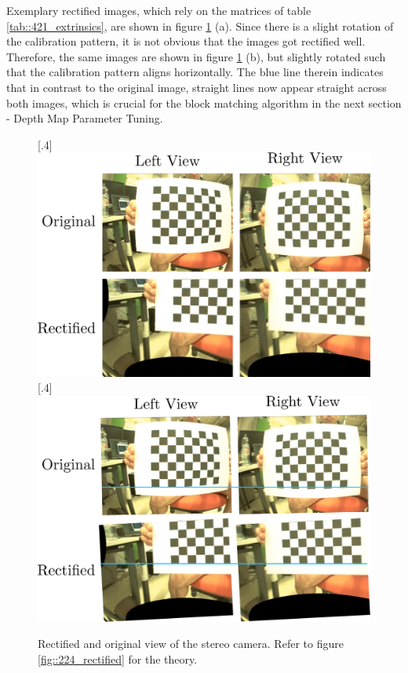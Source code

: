 Exemplary rectified images, which rely on the matrices of table \ref{tab::421_extrinsics}, are shown in figure \ref{fig::421_rect} (a). Since there is a slight rotation of the calibration pattern, it is not obvious that the images got rectified well. Therefore, the same images are shown in figure \ref{fig::421_rect} (b), but slightly rotated such that the calibration pattern aligns horizontally. The blue line therein indicates that in contrast to the original image, straight lines now appear straight across both images, which is crucial for the block matching algorithm in the next section - Depth Map Parameter Tuning.
\begin{figure}[h!]
	\centering
	[.4\linewidth]{\includegraphics[scale=.25]{chapters/04_experiments/02_autonomous_walking/01_camera_calibration/rect.png}}
	[.4\linewidth]{\includegraphics[scale=.25]{chapters/04_experiments/02_autonomous_walking/01_camera_calibration/rect_line.png}}
	\caption{Rectified and original view of the stereo camera. Refer to figure \ref{fig::224_rectified} for the theory.}
	\label{fig::421_rect}
\end{figure}
\FloatBarrier
